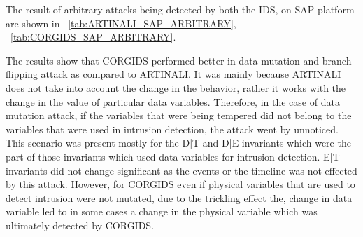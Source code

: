 The result of arbitrary attacks being detected by both the IDS, on SAP platform are shown in ~\autoref{tab:ARTINALI_SAP_ARBITRARY}, ~\autoref{tab:CORGIDS_SAP_ARBITRARY}.

\begin{table}
\centering
  \caption{Results of intrusion detection by ARTINALI for Arbitrary attacks on SAP platform}
  \label{tab:ARTINALI_SAP_ARBITRARY}
\end{table}


\begin{table}
\centering
  \caption{Results of intrusion detection by CORGIDS for Arbitrary attacks on SAP platform}
  \label{tab:CORGIDS_SAP_ARBITRARY}
\end{table}

The results show that CORGIDS performed better in data mutation and branch flipping attack as compared to ARTINALI. It was mainly because ARTINALI does not take into account the change in the behavior, rather it works with the change in the value of particular data variables. Therefore, in the case of data mutation attack, if the variables that were being tempered did not belong to the variables that were used in intrusion detection, the attack went by unnoticed. This scenario was present mostly for the D|T and D|E invariants which were the part of those invariants which used data variables for intrusion detection. E|T invariants did not change significant as the events or the timeline was not effected by this attack. However, for CORGIDS even if physical variables that are used to detect intrusion were not mutated, due to the trickling effect the, change in data variable led to in some cases a change in the physical variable which was ultimately detected by CORGIDS.

